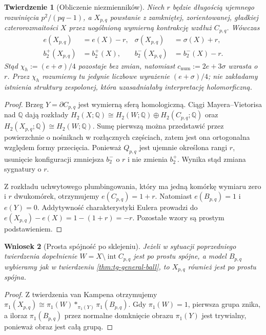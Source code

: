 \documentclass[11pt,a4paper]{report}
\numberwithin{equation}{section}
\theoremstyle{plain}
\newtheorem{twierdzenie}{Twierdzenie}[section]
\newtheorem{wniosek}[twierdzenie]{Wniosek}
\theoremstyle{definition}
\theoremstyle{remark}
\begin{document}
\begin{twierdzenie}[Obliczenie niezmienników]
\label{thm:tg-general-numeric}
Niech $r$ będzie długością ujemnego rozwinięcia
$p^2/(pq-1)$, a $X_{p,q}$ powstanie z zamkniętej,
zorientowanej, gładkiej czterorozmaitości $X$
przez uogólnioną wymierną kontrakcję wzdłuż $C_{p,q}$.
Wówczas
\[
\begin{aligned}
e(X_{p,q})&=e(X)-r,&
\sigma(X_{p,q})&=\sigma(X)+r,\\
b_2^+(X_{p,q})&=b_2^+(X),&
b_2^-(X_{p,q})&=b_2^-(X)-r.
\end{aligned}
\]
Stąd $\chi_h:=(e+\sigma)/4$ pozostaje bez zmian,
natomiast $c_{\mathrm{num}}:=2e+3\sigma$ wzrasta o $r$.
Przez $\chi_h$ rozumiemy tu jedynie liczbowe wyrażenie
$(e+\sigma)/4$; nie zakładamy istnienia struktury
zespolonej, która uzasadniałaby interpretację holomorficzną.
\end{twierdzenie}

\begin{proof}
Brzeg $Y=\partial C_{p,q}$ jest wymierną sferą homologiczną.
Ciągi Mayera--Vietorisa nad $\mathbb Q$ dają rozkłady
$H_2(X;\mathbb Q)\cong H_2(W;\mathbb Q)\oplus
H_2(C_{p,q};\mathbb Q)$ oraz
$H_2(X_{p,q};\mathbb Q)\cong H_2(W;\mathbb Q)$.
Sumę pierwszą można przedstawić przez powierzchnie o nośnikach
w rozłącznych częściach, zatem jest ona ortogonalna względem
formy przecięcia. Ponieważ $Q_{p,q}$ jest ujemnie określona
rangi $r$, usunięcie konfiguracji zmniejsza $b_2^-$ o $r$
i nie zmienia $b_2^+$. Wynika stąd zmiana sygnatury o $r$.

Z rozkładu uchwytowego plumbingowania, który ma jedną
komórkę wymiaru zero i $r$ dwukomórek, otrzymujemy
$e(C_{p,q})=1+r$. Natomiast $e(B_{p,q})=1$
i $e(Y)=0$. Addytywność charakterystyki Eulera prowadzi do
$e(X_{p,q})-e(X)=1-(1+r)=-r$.
Pozostałe wzory są prostym podstawieniem.
\end{proof}

\begin{wniosek}[Prosta spójność po sklejeniu]
Jeżeli w sytuacji poprzedniego twierdzenia dopełnienie
$W=X\setminus\operatorname{int}C_{p,q}$ jest po prostu spójne,
a model $B_{p,q}$ wybieramy jak w twierdzeniu
\ref{thm:tg-general-ball}, to $X_{p,q}$ również jest po prostu
spójna.
\end{wniosek}

\begin{proof}
Z twierdzenia van Kampena otrzymujemy
$\pi_1(X_{p,q})\cong\pi_1(W)*_{\pi_1(Y)}\pi_1(B_{p,q})$.
Gdy $\pi_1(W)=1$, pierwsza grupa znika, a iloraz
$\pi_1(B_{p,q})$ przez normalne domknięcie obrazu
$\pi_1(Y)$ jest trywialny, ponieważ obraz jest całą grupą.
\end{proof}
\end{document}
